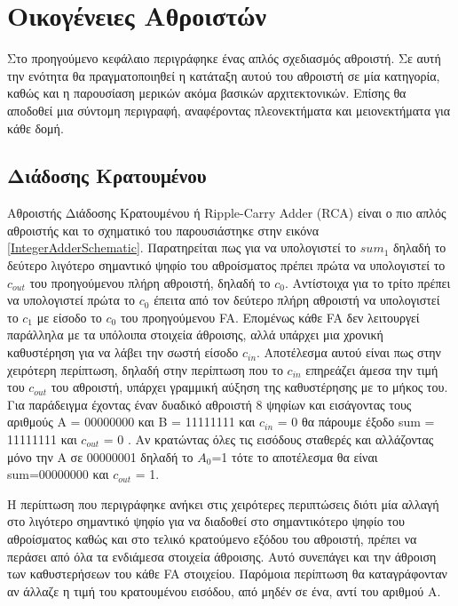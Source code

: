 \section{Οικογένειες Αθροιστών}
Στο προηγούμενο κεφάλαιο περιγράφηκε ένας απλός σχεδιασμός αθροιστή. Σε αυτή την ενότητα θα πραγματοποιηθεί η κατάταξη αυτού του αθροιστή σε μία κατηγορία, καθώς και η παρουσίαση μερικών ακόμα βασικών αρχιτεκτονικών. Επίσης θα αποδοθεί μια σύντομη περιγραφή, αναφέροντας πλεονεκτήματα και μειονεκτήματα για κάθε δομή. 



\subsection{Διάδοσης Κρατουμένου}
Αθροιστής Διάδοσης Κρατουμένου ή Ripple-Carry Adder (RCA) είναι ο πιο απλός αθροιστής και το σχηματικό του παρουσιάστηκε στην εικόνα \ref{IntegerAdderSchematic}. Παρατηρείται πως για να υπολογιστεί το $sum_1$ δηλαδή το δεύτερο λιγότερο σημαντικό ψηφίο του αθροίσματος πρέπει πρώτα να υπολογιστεί το $c_{out}$ του προηγούμενου πλήρη αθροιστή, δηλαδή το $c_0$. Αντίστοιχα για το τρίτο πρέπει να υπολογιστεί πρώτα το $c_0$ έπειτα από τον δεύτερο πλήρη αθροιστή να υπολογιστεί το $c_1$ με είσοδο το $c_0$ του προηγούμενου FA. Επομένως κάθε FA δεν λειτουργεί παράλληλα με τα υπόλοιπα στοιχεία άθροισης, αλλά υπάρχει μια χρονική καθυστέρηση για να λάβει την σωστή είσοδο $c_{in}$. Αποτέλεσμα αυτού είναι πως στην χειρότερη περίπτωση, δηλαδή στην περίπτωση που το $c_{in}$ επηρεάζει άμεσα την τιμή του $c_{out}$ του αθροιστή, υπάρχει γραμμική αύξηση της καθυστέρησης με το μήκος του.
Για παράδειγμα έχοντας έναν δυαδικό αθροιστή 8 ψηφίων και εισάγοντας τους αριθμούς Α = 00000000 και Β = 11111111 και $c_{in}$ = 0 θα πάρουμε έξοδο sum = 11111111 και $c_{out}$ = 0 . Αν κρατώντας όλες τις εισόδους σταθερές και αλλάζοντας μόνο την Α σε 00000001 δηλαδή το $A_0$=1 τότε το αποτέλεσμα θα είναι sum=00000000 και $c_{out}$ = 1. 

Η περίπτωση που περιγράφηκε ανήκει στις χειρότερες περιπτώσεις διότι μία αλλαγή στο λιγότερο σημαντικό ψηφίο για να διαδοθεί στο σημαντικότερο ψηφίο του αθροίσματος καθώς και στο τελικό κρατούμενο εξόδου του αθροιστή, πρέπει να περάσει από όλα τα ενδιάμεσα στοιχεία άθροισης. Αυτό συνεπάγει και την άθροιση των καθυστερήσεων του κάθε FA στοιχείου. Παρόμοια περίπτωση θα καταγράφονταν αν άλλαζε η τιμή του κρατουμένου εισόδου, από μηδέν σε ένα, αντί του αριθμού A.


